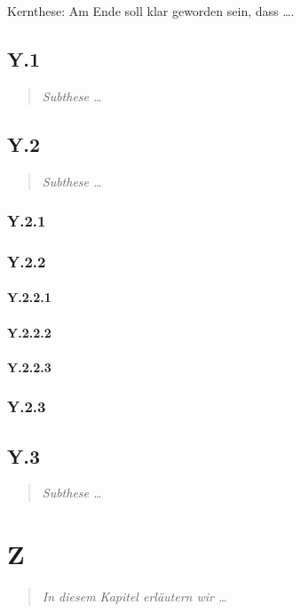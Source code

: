 \documentclass[
  DIV=calc,
  BCOR=5mm,
  11pt,
  headings=small,
  oneside,
  abstract=true,
  toc=bib,
  english,ngerman]{scrbook}
\begin{document}
Kernthese: Am Ende soll klar geworden sein, dass \ldots.

\section{Y.1}
\begin{quote}\itshape
Subthese \ldots
\end{quote} 

\section{Y.2}
\begin{quote}\itshape
Subthese \ldots
\end{quote} 

\subsection{Y.2.1}

\subsection{Y.2.2}

\subsubsection{Y.2.2.1}
\subsubsection{Y.2.2.2}
\subsubsection{Y.2.2.3}

\subsection{Y.2.3}

\section{Y.3}
\begin{quote}\itshape
Subthese \ldots
\end{quote} 

\chapter{Z}
\begin{quote}\itshape
In diesem Kapitel erläutern wir \ldots
\end{quote} 
\end{document}
